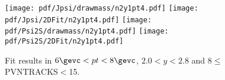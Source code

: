 \begin{figure}[H]
\begin{center}
\texttt{[image: pdf/Jpsi/drawmass/n2y1pt4.pdf]}
\texttt{[image: pdf/Jpsi/2DFit/n2y1pt4.pdf]}
\vspace*{-0.5cm}
\texttt{[image: pdf/Psi2S/drawmass/n2y1pt4.pdf]}
\texttt{[image: pdf/Psi2S/2DFit/n2y1pt4.pdf]}
\vspace*{-0.5cm}
\end{center}
\caption{Fit results in $6\gevc<pt<8\gevc$, $2.0<y<2.8$ and 8$\leq$PVNTRACKS$<$15.}
\label{Fitn2y1pt4}
\end{figure}
